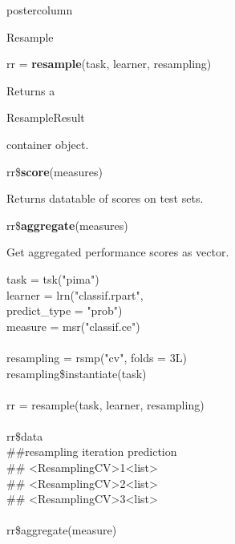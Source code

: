 \documentclass{beamer}
\newcommand{\codeinline}[1]{\begin{codeboxinline}#1\end{codeboxinline}}
\newcommand{\monospace}[1]{\multido{}{#1}{\space}}
\begin{document}
\begin{withoutheader}
\begin{frame}[fragile]{}
\begin{columns}
\begin{column}{.245\textwidth}
\begin{beamercolorbox}[center]{postercolumn}
\begin{minipage}{.98\textwidth}
{\begin{myblock}{Resample}
							\begin{codebox}
								rr = \textbf{resample}(task, learner, resampling)
							\end{codebox}
							Returns a \codeinline{ResampleResult} container object.
							\\
							\vspace{1em}
							\begin{codebox}
								rr\$\textbf{score}(measures)
							\end{codebox}
							Returns datatable of scores on test sets.
							\\
							\begin{codebox}
								rr\$\textbf{aggregate}(measures)
							\end{codebox}
						    Get aggregated performance scores as vector.
							\\
							\begin{codeboxexample}
								\footnotesize{
									task = tsk("pima")\\
									learner = lrn("classif.rpart", \\
									\hspace*{1ex}predict\_type = "prob")\\
									measure = msr("classif.ce")\\
									\vspace{1em}
									\\
									resampling = rsmp("cv", folds = 3L)\\
									resampling\$instantiate(task)\\
									\vspace{1em}
									\\
									rr = resample(task, learner, resampling)\\
									\vspace{1em}
									\\
									rr\$data\\
									\#\#\monospace{5}resampling iteration prediction\\
									\#\# <ResamplingCV>\monospace{9}1\monospace{5}<list>\\
									\#\# <ResamplingCV>\monospace{9}2\monospace{5}<list>\\
									\#\# <ResamplingCV>\monospace{9}3\monospace{5}<list>\\
									\vspace{1em}
									\\
									rr\$aggregate(measure)\\
}
\end{codeboxexample}
\end{myblock}}
\end{minipage}
\end{beamercolorbox}
\end{column}
\end{columns}
\end{frame}
\end{withoutheader}
\end{document}
